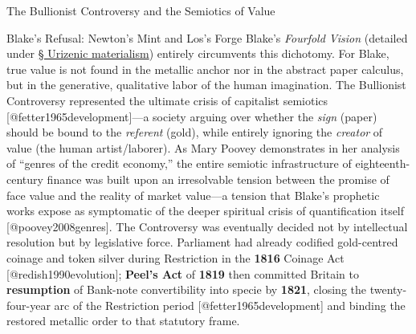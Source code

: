 \documentclass[
  ignorenonframetext,
]{beamer}
\begin{document}
\begin{frame}{The Bullionist Controversy and the Semiotics of Value}
\begin{block}{Blake's Refusal: Newton's Mint and Los's Forge}
Blake's \emph{Fourfold Vision} (detailed under
\hyperlink{sec-urizenic-materialism}{§ Urizenic materialism}) entirely
circumvents this dichotomy. For Blake, true value is not found in the
metallic anchor nor in the abstract paper calculus, but in the
generative, qualitative labor of the human imagination. The Bullionist
Controversy represented the ultimate crisis of capitalist semiotics
{[}@fetter1965development{]}---a society arguing over whether the
\emph{sign} (paper) should be bound to the \emph{referent} (gold), while
entirely ignoring the \emph{creator} of value (the human
artist/laborer). As Mary Poovey demonstrates in her analysis of ``genres
of the credit economy,'' the entire semiotic infrastructure of
eighteenth-century finance was built upon an irresolvable tension
between the promise of face value and the reality of market value---a
tension that Blake's prophetic works expose as symptomatic of the deeper
spiritual crisis of quantification itself {[}@poovey2008genres{]}. The
Controversy was eventually decided not by intellectual resolution but by
legislative force. Parliament had already codified gold-centred coinage
and token silver during Restriction in the \textbf{1816} Coinage Act
{[}@redish1990evolution{]}; \textbf{Peel's Act} of \textbf{1819} then
committed Britain to \textbf{resumption} of Bank-note convertibility
into specie by \textbf{1821}, closing the twenty-four-year arc of the
Restriction period {[}@fetter1965development{]} and binding the restored
metallic order to that statutory frame.
\end{block}
\end{frame}
\end{document}
